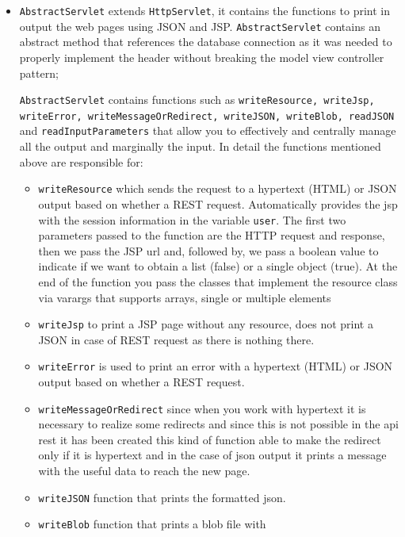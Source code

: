 \begin{itemize}
    \item \texttt{AbstractServlet} extends \texttt{HttpServlet}, 
    it contains the functions to print in output the web pages using JSON and JSP.
    \texttt{AbstractServlet} contains an abstract method that references the 
    database connection as it was needed to properly implement the header
    without breaking the model view controller pattern;

    \texttt{AbstractServlet} contains functions such as 
    \texttt{writeResource, writeJsp, writeError, writeMessageOrRedirect, 
    writeJSON, writeBlob, readJSON}  and \texttt{readInputParameters}
    that allow you to effectively and centrally manage all the output 
    and marginally the input.
    In detail the functions mentioned above are responsible for: 
    \begin{itemize}
        \item \texttt{writeResource} which sends the request to a hypertext (HTML) 
        or JSON output based on whether a REST request. 
        Automatically provides the jsp with the session information in 
        the variable \texttt{user}.
        The first two parameters passed to the function are the HTTP request and 
        response, then we pass the JSP url and, followed by, we pass a boolean 
        value to indicate if we want to obtain a list (false) or a single object (true).
        At the end of the function you pass the classes that implement the 
        resource class via varargs that supports arrays, single or multiple elements
        \item \texttt{writeJsp} to print a JSP page without any resource, 
        does not print a JSON in case of REST request as there is nothing there.
        \item \texttt{writeError}  is used to print an error with a 
        hypertext (HTML) or JSON output based on whether a REST request. 
        \item \texttt{writeMessageOrRedirect} since when you work with hypertext 
        it is necessary to realize some redirects and since this is not possible 
        in the api rest it has been created this kind of function able to make 
        the redirect only if it is hypertext and in the case of json output it 
        prints a message with the useful data to reach the new page.
        \item \texttt{writeJSON} function that prints the formatted json.
        \item \texttt{writeBlob} function that prints a blob file with 

\end{itemize}
\end{itemize}

